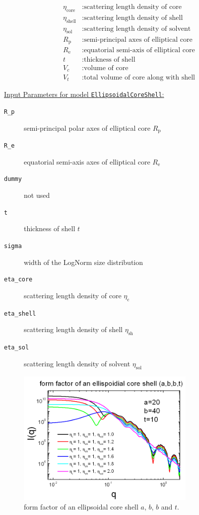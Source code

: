 \begin{align}
\eta_\text{core} &: \text{scattering length density of core} \nonumber \\
\eta_\text{shell} &: \text{scattering length density of shell} \nonumber \\
\eta_\text{sol} &: \text{scattering length density of solvent} \nonumber \\
R_\mathrm{p} &: \text{semi-principal axes of elliptical core} \nonumber \\
R_\mathrm{e} &: \text{equatorial semi-axis of elliptical core} \nonumber \\
t &: \text{thickness of shell} \nonumber \\
V_c &: \text{volume of core} \nonumber \\
V_t &: \text{total volume of core along with shell} \nonumber
\end{align}

\vspace{0.5cm}

\underline{Input Parameters for model \texttt{EllipsoidalCoreShell}:}
\begin{description}
\item[\texttt{R\_p}] semi-principal polar axes of elliptical core $R_\mathrm{p}$
\item[\texttt{R\_e}] equatorial semi-axis axes of elliptical core $R_\mathrm{e}$
\item[\texttt{dummy}] not used
\item[\texttt{t}] thickness of shell $t$
\item[\texttt{sigma}] width of the LogNorm size distribution
\item[\texttt{eta\_core}] scattering length density of core $\eta_\text{c}$
\item[\texttt{eta\_shell}] scattering length density of shell $\eta_\text{sh}$
\item[\texttt{eta\_sol}] scattering length density of solvent $\eta_\text{sol}$
\end{description}

\begin{figure}[htb]
\begin{center}
\includegraphics[width=0.768\textwidth,height=0.588\textwidth]{../images/form_factor/Ellipsoid/ellipsoidal_core_shell.png}
\end{center}
\caption{form factor of an ellipsoidal core shell $a$, $b$, $b$ and
$t$.} \label{fig:I_ellipsoidal_core_shell}
\end{figure}


